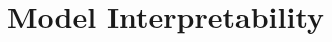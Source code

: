 \documentclass[a4paper,12pt]{report}
\begin{document}


\section{Model Interpretability} %
\end{document}
